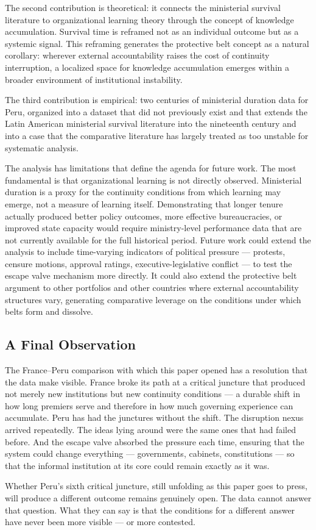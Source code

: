 \documentclass[doc, 12pt, a4paper,floatsintext]{apa7}
\begin{document}
The second contribution is theoretical: it connects the 
ministerial survival literature to organizational learning theory 
through the concept of knowledge accumulation. Survival time is 
reframed not as an individual outcome but as a systemic signal. 
This reframing generates the protective belt concept as a natural 
corollary: wherever external accountability raises the cost of 
continuity interruption, a localized space for knowledge 
accumulation emerges within a broader environment of institutional 
instability.

The third contribution is empirical: two centuries of ministerial 
duration data for Peru, organized into a dataset that did not 
previously exist and that extends the Latin American ministerial 
survival literature into the nineteenth century and into a case 
that the comparative literature has largely treated as too 
unstable for systematic analysis.

The analysis has limitations that define the agenda for future 
work. The most fundamental is that organizational learning is not 
directly observed. Ministerial duration is a proxy for the 
continuity conditions from which learning may emerge, not a 
measure of learning itself. Demonstrating that longer tenure 
actually produced better policy outcomes, more effective 
bureaucracies, or improved state capacity would require 
ministry-level performance data that are not currently available 
for the full historical period. Future work could extend the 
analysis to include time-varying indicators of political pressure 
--- protests, censure motions, approval ratings, executive-legislative 
conflict --- to test the escape valve mechanism more directly. 
It could also extend the protective belt argument to other 
portfolios and other countries where external accountability 
structures vary, generating comparative leverage on the 
conditions under which belts form and dissolve.

\subsection{A Final Observation}

The France--Peru comparison with which this paper opened has a 
resolution that the data make visible. France broke its path 
at a critical juncture that produced not merely new institutions 
but new continuity conditions --- a durable shift in how long 
premiers serve and therefore in how much governing experience 
can accumulate. Peru has had the junctures without the shift. 
The disruption nexus arrived repeatedly. The ideas lying around 
were the same ones that had failed before. And the escape valve 
absorbed the pressure each time, ensuring that the system could 
change everything --- governments, cabinets, constitutions --- 
so that the informal institution at its core could remain 
exactly as it was.

Whether Peru's sixth critical juncture, still unfolding as this 
paper goes to press, will produce a different outcome remains 
genuinely open. The data cannot answer that question. What they 
can say is that the conditions for a different answer have never 
been more visible --- or more contested.

\printbibliography
\end{document}
